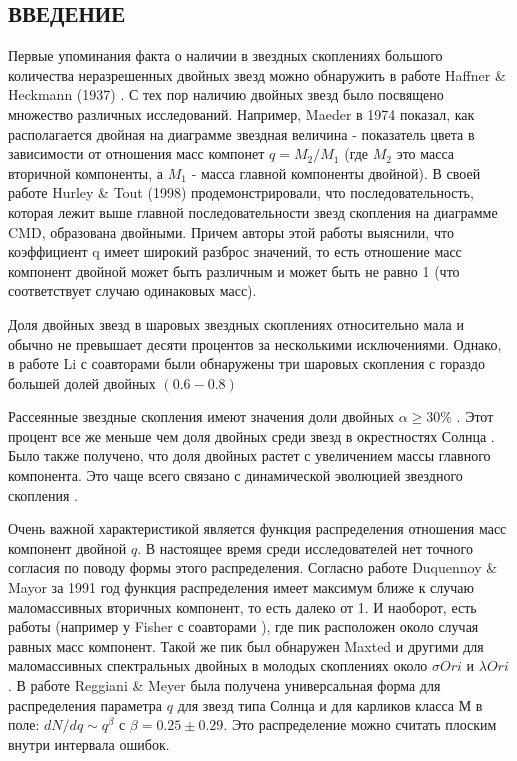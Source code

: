\documentclass[a4paper,12pt]{article}
\begin{document}
\newpage

\begin{center}
\section{ВВЕДЕНИЕ}
\end{center}

Первые упоминания факта о наличии в звездных скоплениях большого количества неразрешенных двойных звезд можно обнаружить в работе Haffner \& Heckmann (1937) \cite{HH}.
С тех пор наличию двойных звезд было посвящено множество различных исследований. Например, Maeder в 1974 \cite{Maeder} показал, как располагается двойная на диаграмме звездная величина - показатель цвета в зависимости от отношения масс компонет $q=M_2/M_1$ (где $M_2$ это масса вторичной компоненты, а $M_1$ - масса главной компоненты двойной). В своей работе Hurley \& Tout (1998) \cite{HT} продемонстрировали, что последовательность, которая лежит выше главной последовательности звезд скопления на диаграмме CMD, образована двойными. Причем авторы этой работы выяснили, что коэффициент q имеет широкий разброс значений, то есть отношение масс компонент двойной может быть различным и может быть не равно 1 (что соответствует случаю одинаковых масс). 

Доля двойных звезд в шаровых звездных скоплениях относительно мала и обычно не превышает десяти процентов \cite{Milone2012} за несколькими исключениями. Однако, в работе Li с соавторами \cite{Li17} были обнаружены три шаровых скопления с гораздо большей долей двойных $(0.6-0.8)$

Рассеянные звездные скопления имеют значения доли двойных $\alpha \geqslant 30\%$ \cite{Li17, Boni, Khalaj, Sarro, alPer}. Этот процент все же меньше чем доля двойных среди звезд в окрестностях Солнца \cite{Duq1}. Было также получено, что доля двойных растет с увеличением массы главного компонента. Это чаще всего связано с динамической эволюцией звездного скопления \cite{KOP,Dorval}.

Очень важной характеристикой является функция распределения отношения масс компонент двойной $q$. В настоящее время среди исследователей нет точного согласия по поводу формы этого распределения. Согласно работе Duquennoy \& Mayor за 1991 год \cite{Duq2} функция распределения имеет максимум ближе к случаю маломассивных вторичных компонент, то есть далеко от 1. И наоборот, есть работы (например у Fisher с соавторами \cite{Fisher}), где пик расположен около случая равных масс компонент. Такой же пик был  обнаружен Maxted и другими \cite{Maxted} для маломассивных спектральных двойных в молодых скоплениях около $\sigma Ori$ и $\lambda Ori$. В работе Reggiani \& Meyer \cite{RM} была получена универсальная форма для распределения параметра $q$ для звезд типа Солнца и для карликов класса М в поле: $dN/dq \sim q^{\beta}$ с $\beta=0.25\pm0.29$. Это распределение можно считать плоским внутри интервала ошибок. 
\end{document}
